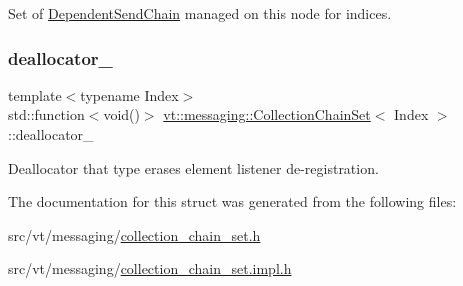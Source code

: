 Set of {\ttfamily \hyperlink{classvt_1_1messaging_1_1_dependent_send_chain}{Dependent\+Send\+Chain}} managed on this node for indices. 

\mbox{\label{classvt_1_1messaging_1_1_collection_chain_set_a0c471bdf6ef26c2ca5c214bdda8eb866}} 
\subsubsection{\texorpdfstring{deallocator\+\_\+}{deallocator\_}}
{\footnotesize\ttfamily template$<$typename Index$>$ \\
std\+::function$<$void()$>$ \hyperlink{classvt_1_1messaging_1_1_collection_chain_set}{vt\+::messaging\+::\+Collection\+Chain\+Set}$<$ Index $>$\+::deallocator\+\_\+\hspace{0.3cm}{\ttfamily [private]}}



Deallocator that type erases element listener de-\/registration. 



The documentation for this struct was generated from the following files\+:\begin{DoxyCompactItemize}
\item 
src/vt/messaging/\hyperlink{collection__chain__set_8h}{collection\+\_\+chain\+\_\+set.\+h}\item 
src/vt/messaging/\hyperlink{collection__chain__set_8impl_8h}{collection\+\_\+chain\+\_\+set.\+impl.\+h}\end{DoxyCompactItemize}

